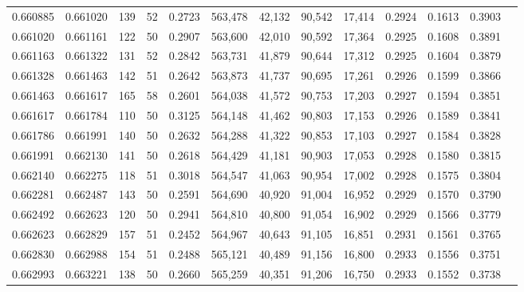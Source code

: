 \begin{tabular}{rrrrrrrrrrrrr}
0.660885 & 0.661020 &   139 &  52 &                                     0.2723 & 563,478 &  42,132 &  90,542 &  17,414 & 0.2924 & 0.1613 & 0.3903 \\
0.661020 & 0.661161 &   122 &  50 &                                     0.2907 & 563,600 &  42,010 &  90,592 &  17,364 & 0.2925 & 0.1608 & 0.3891 \\
0.661163 & 0.661322 &   131 &  52 &                                     0.2842 & 563,731 &  41,879 &  90,644 &  17,312 & 0.2925 & 0.1604 & 0.3879 \\
0.661328 & 0.661463 &   142 &  51 &                                     0.2642 & 563,873 &  41,737 &  90,695 &  17,261 & 0.2926 & 0.1599 & 0.3866 \\
0.661463 & 0.661617 &   165 &  58 &                                     0.2601 & 564,038 &  41,572 &  90,753 &  17,203 & 0.2927 & 0.1594 & 0.3851 \\
0.661617 & 0.661784 &   110 &  50 &                                     0.3125 & 564,148 &  41,462 &  90,803 &  17,153 & 0.2926 & 0.1589 & 0.3841 \\
0.661786 & 0.661991 &   140 &  50 &                                     0.2632 & 564,288 &  41,322 &  90,853 &  17,103 & 0.2927 & 0.1584 & 0.3828 \\
0.661991 & 0.662130 &   141 &  50 &                                     0.2618 & 564,429 &  41,181 &  90,903 &  17,053 & 0.2928 & 0.1580 & 0.3815 \\
0.662140 & 0.662275 &   118 &  51 &                                     0.3018 & 564,547 &  41,063 &  90,954 &  17,002 & 0.2928 & 0.1575 & 0.3804 \\
0.662281 & 0.662487 &   143 &  50 &                                     0.2591 & 564,690 &  40,920 &  91,004 &  16,952 & 0.2929 & 0.1570 & 0.3790 \\
0.662492 & 0.662623 &   120 &  50 &                                     0.2941 & 564,810 &  40,800 &  91,054 &  16,902 & 0.2929 & 0.1566 & 0.3779 \\
0.662623 & 0.662829 &   157 &  51 &                                     0.2452 & 564,967 &  40,643 &  91,105 &  16,851 & 0.2931 & 0.1561 & 0.3765 \\
0.662830 & 0.662988 &   154 &  51 &                                     0.2488 & 565,121 &  40,489 &  91,156 &  16,800 & 0.2933 & 0.1556 & 0.3751 \\
0.662993 & 0.663221 &   138 &  50 &                                     0.2660 & 565,259 &  40,351 &  91,206 &  16,750 & 0.2933 & 0.1552 & 0.3738 \\

\end{tabular}
